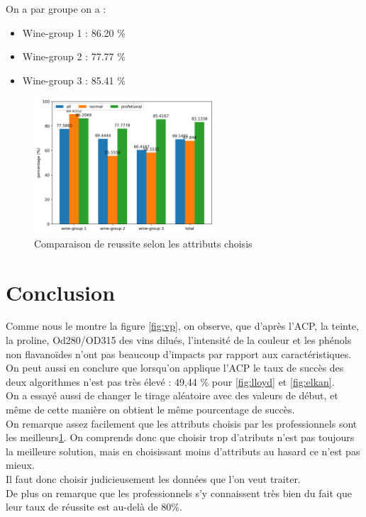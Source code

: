 \documentclass[a4paper,12pt]{article}
\begin{document}
On a par groupe on a :
\begin{itemize}
\item Wine-group 1 : 86.20 \%
\item Wine-group 2 : 77.77 \%
\item Wine-group 3 : 85.41 \%
\end{itemize}
\newpage
\begin{figure}[h!] %
   \centering
   \includegraphics[width=0.6\textwidth]{differents_attributes.png} %
   \caption{Comparaison de reussite selon les attributs choisis}
   \label{fig:compare}
\end{figure}

\section{Conclusion}
\label{sec:conclusion}

Comme nous le montre la figure \ref{fig:vp}, on observe, que d'après l'ACP,  la teinte, la proline, Od280/OD315 des vins dilués, l'intensité de la couleur et les phénols non flavanoïdes n'ont pas beaucoup d'impacts par rapport aux caractéristiques.\\

On peut aussi en conclure que lorsqu'on applique l'ACP le taux de succès des deux algorithmes n'est pas très élevé : 49,44 \% pour \ref{fig:lloyd} et \ref{fig:elkan}.\\

On a essayé aussi de changer le tirage aléatoire avec des valeurs de début, et même de cette manière on obtient le même pourcentage de succès.\\

On remarque assez facilement que les attributs choisis par les professionnels sont les meilleurs\ref{fig:compare}. On comprends donc que choisir trop d'atributs n'est pas toujours la meilleure solution, mais en choisissant moins d'attributs au hasard ce n'est pas mieux.\\

Il faut donc choisir judicieusement les données que l'on veut traiter.\\

De plus on remarque que les professionnels s'y connaissent très bien du fait que leur taux de réussite est au-delà de 80\%. 
\end{document}
